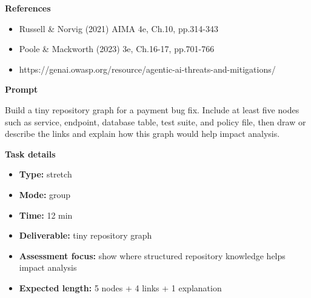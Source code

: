 \documentclass[11pt]{article}
\begin{document}
\begin{tcolorbox}[colback=white,colframe=MidnightBlue,title={Q5 Exam-Style Constructed Response},fonttitle=\bfseries,breakable]
{\large\bfseries\color{MidnightBlue} References}\par\medskip
\begin{itemize}\item Russell \& Norvig (2021) AIMA 4e, Ch.10, pp.314-343
\item Poole \& Mackworth (2023) 3e, Ch.16-17, pp.701-766
\item https://genai.owasp.org/resource/agentic-ai-threats-and-mitigations/\end{itemize}
\end{tcolorbox}

\begin{tcolorbox}[colback=white,colframe=MidnightBlue,title={Q6 Stretch Extension},fonttitle=\bfseries,breakable]
\begin{center}
\end{center}

{\large\bfseries\color{MidnightBlue} Prompt}\par\medskip
Build a tiny repository graph for a payment bug fix. Include at least five nodes such as service, endpoint, database table, test suite, and policy file, then draw or describe the links and explain how this graph would help impact analysis.

{\large\bfseries\color{MidnightBlue} Task details}\par\medskip
\begin{itemize}\item \textbf{Type:} stretch
\item \textbf{Mode:} group
\item \textbf{Time:} 12 min
\item \textbf{Deliverable:} tiny repository graph
\item \textbf{Assessment focus:} show where structured repository knowledge helps impact analysis
\item \textbf{Expected length:} 5 nodes + 4 links + 1 explanation\end{itemize}


\end{tcolorbox}
\end{document}
